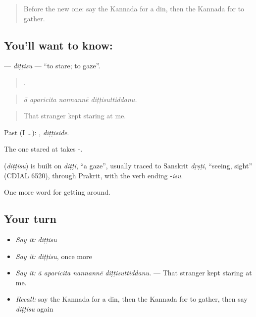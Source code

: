 \label{lesson:KA-C471-dittisu}



\begin{quote}
Before the new one: say the Kannada for a din, then the Kannada for to gather.
\end{quote}

\subsection*{You'll want to know: }
\textbf{} — \emph{diṭṭisu} — \textquotedblleft{}to stare; to gaze\textquotedblright{}.

\begin{quote}
   .
\end{quote}

\begin{quote}
\emph{ā aparicita nannannē diṭṭisuttiddanu.}
\end{quote}

\begin{quote}
That stranger kept staring at me.
\end{quote}

Past (I …): , \emph{diṭṭiside}.

The one stared at takes -.

\begin{cousinweb}
\textbf{} (\emph{diṭṭisu}) is built on \emph{diṭṭi}, \textquotedblleft{}a gaze\textquotedblright{}, usually traced to Sanskrit \emph{dṛṣṭi}, \textquotedblleft{}seeing, sight\textquotedblright{} (CDIAL 6520), through Prakrit, with the verb ending -\emph{isu}.
\end{cousinweb}

\begin{grammarlens}[title={What you've built}]
One more word for getting around.
\end{grammarlens}

\subsection*{Your turn}
\begin{itemize}
\raggedright
  \item \emph{Say it:} \emph{diṭṭisu}
  \item \emph{Say it:} \emph{diṭṭisu}, once more
  \item \emph{Say it:} \emph{ā aparicita nannannē diṭṭisuttiddanu.} — That stranger kept staring at me.
  \item \emph{Recall:} say the Kannada for a din, then the Kannada for to gather, then say \emph{diṭṭisu} again
\end{itemize}

